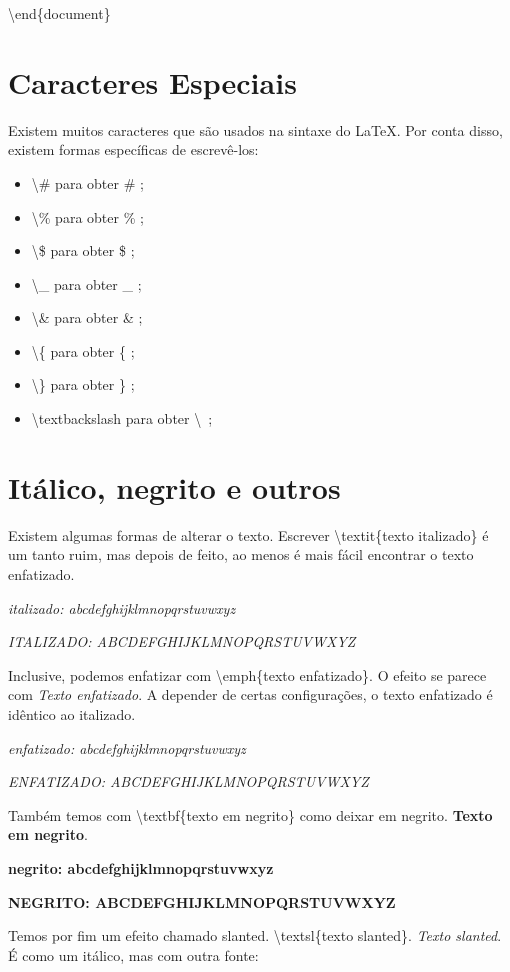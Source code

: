 \documentclass[a4paper, 12pt, oneside]{book}
\begin{document}
\noindent \textbackslash end\{document\}

\section{Caracteres Especiais}
Existem muitos caracteres que são usados na sintaxe do \LaTeX.
Por conta disso, existem formas específicas de escrevê-los:
\begin{itemize}
\item \textbackslash \# para obter \# ;
\item \textbackslash \% para obter \% ;
\item \textbackslash \$ para obter \$ ;
\item \textbackslash \_ para obter \_ ;
\item \textbackslash \& para obter \& ;
\item \textbackslash \{ para obter \{ ;
\item \textbackslash \} para obter \} ;
\item \textbackslash textbackslash para obter \textbackslash\ ;
\end{itemize}

\section{Itálico, negrito e outros}
Existem algumas formas de alterar o texto.
Escrever \textbackslash textit\{texto italizado\} é um tanto ruim,
mas depois de feito, ao menos é mais fácil encontrar o texto enfatizado.

\textit{italizado: abcdefghijklmnopqrstuvwxyz}

\textit{ITALIZADO: ABCDEFGHIJKLMNOPQRSTUVWXYZ}

Inclusive, podemos enfatizar com \textbackslash emph\{texto enfatizado\}.
O efeito se parece com \emph{Texto enfatizado}.
A depender de certas configurações, o texto enfatizado é idêntico ao italizado.

\emph{enfatizado: abcdefghijklmnopqrstuvwxyz}

\emph{ENFATIZADO: ABCDEFGHIJKLMNOPQRSTUVWXYZ}

Também temos com \textbackslash textbf\{texto em negrito\} como deixar em negrito.
\textbf{Texto em negrito}.

\textbf{negrito: abcdefghijklmnopqrstuvwxyz}

\textbf{NEGRITO: ABCDEFGHIJKLMNOPQRSTUVWXYZ}

Temos por fim um efeito chamado slanted. \textbackslash textsl\{texto slanted\}.
\textsl{Texto slanted}. É como um itálico, mas com outra fonte:
\end{document}
